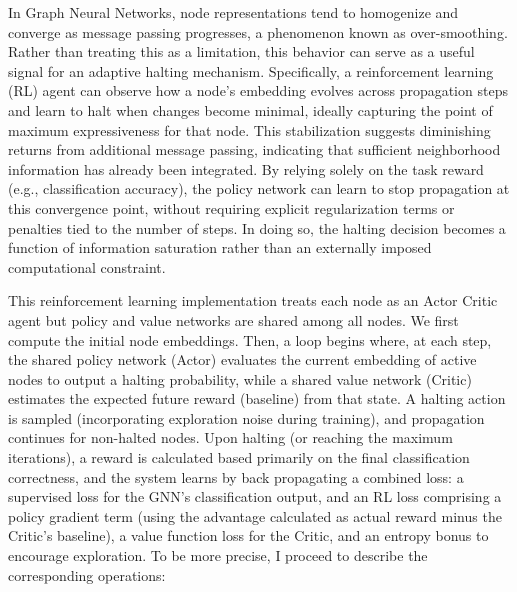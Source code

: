 \documentclass{gdl}
\begin{document}
In Graph Neural Networks, node representations tend to homogenize and converge as message passing progresses, a phenomenon known as over-smoothing. Rather than treating this as a limitation, this behavior can serve as a useful signal for an adaptive halting mechanism. Specifically, a reinforcement learning (RL) agent can observe how a node's embedding evolves across propagation steps and learn to halt when changes become minimal, ideally capturing the point of maximum expressiveness for that node. This stabilization suggests diminishing returns from additional message passing, indicating that sufficient neighborhood information has already been integrated. By relying solely on the task reward (e.g., classification accuracy), the policy network can learn to stop propagation at this convergence point, without requiring explicit regularization terms or penalties tied to the number of steps. In doing so, the halting decision becomes a function of information saturation rather than an externally imposed computational constraint.

This reinforcement learning implementation treats each node as an Actor Critic agent but policy and value networks are shared among all nodes. We first compute the initial node embeddings. Then, a loop begins where, at each step, the shared policy network (Actor) evaluates the current embedding of active nodes to output a halting probability, while a shared value network (Critic) estimates the expected future reward (baseline) from that state. A halting action is sampled (incorporating exploration noise during training), and propagation continues for non-halted nodes. Upon halting (or reaching the maximum iterations), a reward is calculated based primarily on the final classification correctness, and the system learns by back propagating a combined loss: a supervised loss for the GNN's classification output, and an RL loss comprising a policy gradient term (using the advantage calculated as actual reward minus the Critic's baseline), a value function loss for the Critic, and an entropy bonus to encourage exploration. To be more precise, I proceed to describe the corresponding operations: 
\end{document}
